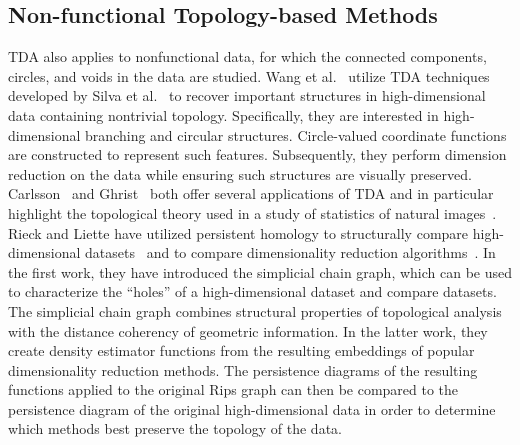\subsection{Non-functional Topology-based Methods}
TDA also applies to nonfunctional data, for which the connected components, circles, and voids in the data are studied.
%
Wang et al.~\cite{WangSummaPascucci2011} utilize TDA techniques developed by Silva et al.~\cite{SilvaMorozovVejdemo-Johansson2009} to recover important structures in high-dimensional data containing nontrivial topology.
%
Specifically, they are interested in high-dimensional branching and circular structures.
%
Circle-valued coordinate functions are constructed to represent such features.
%
Subsequently, they perform dimension reduction on the data while ensuring such structures are visually preserved.
%
Carlsson~\cite{Carlsson2009} and Ghrist~\cite{Ghrist2009} both offer several applications of TDA and in particular highlight the topological theory used in a study of statistics of natural images~\cite{LeePedersenMumford2003}.
%
Rieck and Liette have utilized persistent homology to structurally compare high-dimensional datasets~\cite{RieckLeitte2014} and to compare dimensionality reduction algorithms~\cite{RieckLeitte2015}.
%
In the first work, they have introduced the simplicial chain graph, which can be used to characterize the ``holes'' of a high-dimensional dataset and compare datasets.
%
The simplicial chain graph combines structural properties of topological analysis with the distance coherency of geometric information.
%
In the latter work, they create density estimator functions from the resulting embeddings of popular dimensionality reduction methods.
%
The persistence diagrams of the resulting functions applied to the original Rips graph can then be compared to the persistence diagram of the original high-dimensional data in order to determine which methods best preserve the topology of the data.

% 
